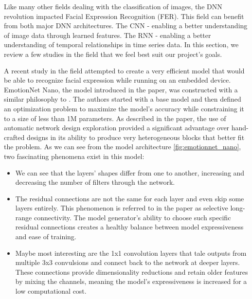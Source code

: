 \documentclass[../main.tex]{subfiles}
\begin{document}
Like many other fields dealing with the classification of images, the DNN revolution impacted Facial Expression Recognition (FER).
This field can benefit from both major DNN architectures. The CNN - enabling a better understanding of image data through learned features.
The RNN - enabling a better understanding of temporal relationships in time series data.
In this section, we review a few studies in the field that we feel best suit our project's goals.
\par

A recent study in the field \cite{emotionnet-nano} attempted to create a very efficient model that would be able
to recognize facial expression while running on an embedded device.  EmotionNet Nano, the model introduced in the paper,
was constructed with a similar philosophy to \cite{effnet}. The authors started with a base model and then defined an
optimization problem to maximize the model's accuracy while constraining it to a size of less than 1M parameters.
As described in the paper, the use of automatic network design exploration provided a significant advantage over hand-crafted
designs in its ability to produce very heterogeneous blocks that better fit the problem.
As we can see from the model architecture \ref{fig:emotionnet_nano}, two fascinating phenomena exist in this model:

\begin{itemize}
    \item We can see that the layers' shapes differ from one to another, increasing and decreasing the number of filters through the network.
    \item The residual connections are not the same for each layer and even skip some layers entirely.
        This phenomenon is referred to in the paper as selective long-range connectivity. The model generator's ability to choose such
        specific residual connections creates a healthy balance between model expressiveness and ease of training.
    \item Maybe most interesting are the 1x1 convolution layers that tale outputs from multiple 3x3 convulsions
        and connect back to the network at deeper layers. These connections provide dimensionality reductions and retain older
        features by mixing the channels, meaning the model's expressiveness is increased for a low computational cost.
\end{itemize}
\end{document}
